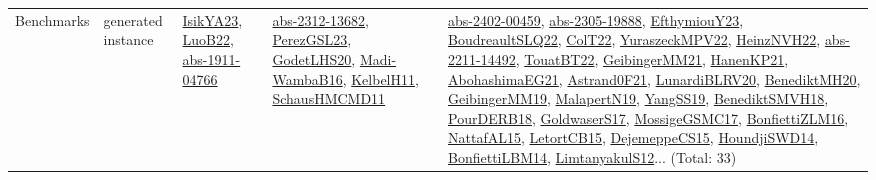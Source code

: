 {\begin{longtable}{lp{3cm}>{\raggedright}p{6cm}>{\raggedright}p{6cm}p{8cm}}
Benchmarks & generated instance & \href{articles/IsikYA23.pdf}{IsikYA23}\cite{IsikYA23}, \href{papers/LuoB22.pdf}{LuoB22}\cite{LuoB22}, \href{articles/abs-1911-04766.pdf}{abs-1911-04766}\cite{abs-1911-04766} & \href{articles/abs-2312-13682.pdf}{abs-2312-13682}\cite{abs-2312-13682}, \href{papers/PerezGSL23.pdf}{PerezGSL23}\cite{PerezGSL23}, \href{papers/GodetLHS20.pdf}{GodetLHS20}\cite{GodetLHS20}, \href{papers/Madi-WambaB16.pdf}{Madi-WambaB16}\cite{Madi-WambaB16}, \href{articles/KelbelH11.pdf}{KelbelH11}\cite{KelbelH11}, \href{articles/SchausHMCMD11.pdf}{SchausHMCMD11}\cite{SchausHMCMD11} & \href{articles/abs-2402-00459.pdf}{abs-2402-00459}\cite{abs-2402-00459}, \href{articles/abs-2305-19888.pdf}{abs-2305-19888}\cite{abs-2305-19888}, \href{papers/EfthymiouY23.pdf}{EfthymiouY23}\cite{EfthymiouY23}, \href{papers/BoudreaultSLQ22.pdf}{BoudreaultSLQ22}\cite{BoudreaultSLQ22}, \href{articles/ColT22.pdf}{ColT22}\cite{ColT22}, \href{articles/YuraszeckMPV22.pdf}{YuraszeckMPV22}\cite{YuraszeckMPV22}, \href{articles/HeinzNVH22.pdf}{HeinzNVH22}\cite{HeinzNVH22}, \href{articles/abs-2211-14492.pdf}{abs-2211-14492}\cite{abs-2211-14492}, \href{papers/TouatBT22.pdf}{TouatBT22}\cite{TouatBT22}, \href{papers/GeibingerMM21.pdf}{GeibingerMM21}\cite{GeibingerMM21}, \href{papers/HanenKP21.pdf}{HanenKP21}\cite{HanenKP21}, \href{articles/AbohashimaEG21.pdf}{AbohashimaEG21}\cite{AbohashimaEG21}, \href{papers/Astrand0F21.pdf}{Astrand0F21}\cite{Astrand0F21}, \href{articles/LunardiBLRV20.pdf}{LunardiBLRV20}\cite{LunardiBLRV20}, \href{articles/BenediktMH20.pdf}{BenediktMH20}\cite{BenediktMH20}, \href{papers/GeibingerMM19.pdf}{GeibingerMM19}\cite{GeibingerMM19}, \href{papers/MalapertN19.pdf}{MalapertN19}\cite{MalapertN19}, \href{papers/YangSS19.pdf}{YangSS19}\cite{YangSS19}, \href{papers/BenediktSMVH18.pdf}{BenediktSMVH18}\cite{BenediktSMVH18}, \href{articles/PourDERB18.pdf}{PourDERB18}\cite{PourDERB18}, \href{papers/GoldwaserS17.pdf}{GoldwaserS17}\cite{GoldwaserS17}, \href{papers/MossigeGSMC17.pdf}{MossigeGSMC17}\cite{MossigeGSMC17}, \href{papers/BonfiettiZLM16.pdf}{BonfiettiZLM16}\cite{BonfiettiZLM16}, \href{articles/NattafAL15.pdf}{NattafAL15}\cite{NattafAL15}, \href{articles/LetortCB15.pdf}{LetortCB15}\cite{LetortCB15}, \href{papers/DejemeppeCS15.pdf}{DejemeppeCS15}\cite{DejemeppeCS15}, \href{papers/HoundjiSWD14.pdf}{HoundjiSWD14}\cite{HoundjiSWD14}, \href{articles/BonfiettiLBM14.pdf}{BonfiettiLBM14}\cite{BonfiettiLBM14}, \href{articles/LimtanyakulS12.pdf}{LimtanyakulS12}\cite{LimtanyakulS12}... (Total: 33)\\

\end{longtable}}
